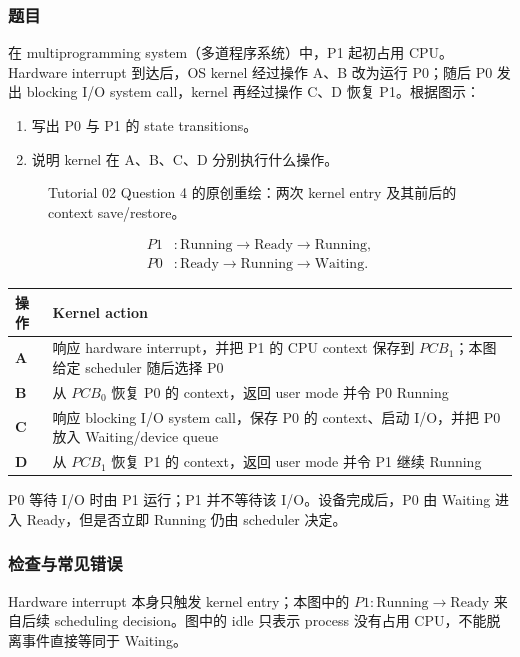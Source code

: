 \subsubsection*{题目}

在 multiprogramming system（多道程序系统）中，P1 起初占用 CPU。Hardware interrupt 到达后，OS kernel 经过操作 A、B 改为运行 P0；随后 P0 发出 blocking I/O system call，kernel 再经过操作 C、D 恢复 P1。根据图示：

\begin{enumerate}[label=(\alph*)]
  \item 写出 P0 与 P1 的 state transitions。
  \item 说明 kernel 在 A、B、C、D 分别执行什么操作。
\end{enumerate}

\begin{figure}[htbp]
  \centering
  \resizebox{0.92\textwidth}{!}{}
  \caption{Tutorial 02 Question 4 的原创重绘：两次 kernel entry 及其前后的 context save/restore。}
  \label{fig:sc2005-tut02-context-switch}
\end{figure}

\clearpage
\begin{checkedsolution}
\[
\begin{aligned}
  P1 &: \mathrm{Running}\rightarrow\mathrm{Ready}\rightarrow\mathrm{Running},\\
  P0 &: \mathrm{Ready}\rightarrow\mathrm{Running}\rightarrow\mathrm{Waiting}.
\end{aligned}
\]

\begin{center}
\small
\begin{tabularx}{0.94\textwidth}{@{}>{\bfseries}lX@{}}
  \toprule
  操作 & Kernel action \\
  \midrule
  A & 响应 hardware interrupt，并把 P1 的 CPU context 保存到 $PCB_1$；本图给定 scheduler 随后选择 P0 \\
  B & 从 $PCB_0$ 恢复 P0 的 context，返回 user mode 并令 P0 Running \\
  C & 响应 blocking I/O system call，保存 P0 的 context、启动 I/O，并把 P0 放入 Waiting/device queue \\
  D & 从 $PCB_1$ 恢复 P1 的 context，返回 user mode 并令 P1 继续 Running \\
  \bottomrule
\end{tabularx}
\end{center}

P0 等待 I/O 时由 P1 运行；P1 并不等待该 I/O。设备完成后，P0 由 Waiting 进入 Ready，但是否立即 Running 仍由 scheduler 决定。
\end{checkedsolution}

\subsubsection*{检查与常见错误}

Hardware interrupt 本身只触发 kernel entry；本图中的 $P1:\mathrm{Running}\rightarrow\mathrm{Ready}$ 来自后续 scheduling decision。图中的 idle 只表示 process 没有占用 CPU，不能脱离事件直接等同于 Waiting。
